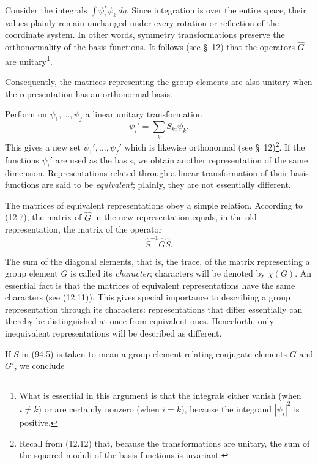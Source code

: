 Consider the integrals $\int\psi_i^*\psi_k\,dq$. Since integration is over the entire space, their values plainly remain unchanged under every rotation or reflection of the coordinate system. In other words, symmetry transformations preserve the orthonormality of the basis functions. It follows (see \S~12) that the operators $\widehat G$ are unitary\footnote{What is essential in this argument is that the integrals either vanish (when $i\ne k$) or are certainly nonzero (when $i=k$), because the integrand $|\psi_i|^2$ is positive.}.

Consequently, the matrices representing the group elements are also unitary when the representation has an orthonormal basis.

Perform on $\psi_1,\ldots,\psi_f$ a linear unitary transformation
\begin{equation}
 \psi_i'=\sum_kS_{ki}\psi_k.
 \tag{94.4}
\end{equation}
This gives a new set $\psi_1',\ldots,\psi_f'$ which is likewise orthonormal (see \S~12)\footnote{Recall from (12.12) that, because the transformations are unitary, the sum of the squared moduli of the basis functions is invariant.}. If the functions $\psi_i'$ are used as the basis, we obtain another representation of the same dimension. Representations related through a linear transformation of their basis functions are said to be \emph{equivalent}; plainly, they are not essentially different.

The matrices of equivalent representations obey a simple relation. According to (12.7), the matrix of $\widehat G$ in the new representation equals, in the old representation, the matrix of the operator
\begin{equation}
 \widehat{S}^{-1}\widehat G\widehat S.
 \tag{94.5}
\end{equation}

The sum of the diagonal elements, that is, the trace, of the matrix representing a group element $G$ is called its \emph{character}; characters will be denoted by $\chi(G)$. An essential fact is that the matrices of equivalent representations have the same characters (see (12.11)). This gives special importance to describing a group representation through its characters: representations that differ essentially can thereby be distinguished at once from equivalent ones. Henceforth, only inequivalent representations will be described as different.

If $S$ in (94.5) is taken to mean a group element relating conjugate elements $G$ and $G'$, we conclude

